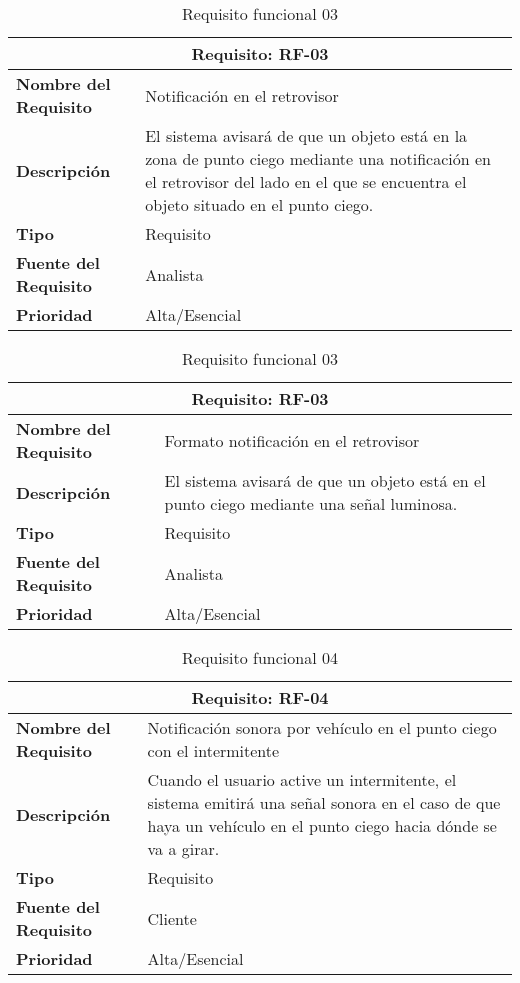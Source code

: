 \documentclass[10pt,a4paper,oldfontcommands]{dpds}
\begin{document}
\begin{table}[H]
\begin{center}
\begin{tabular}{p{} p{7cm}}
\multicolumn{2}{c}{\textbf{Requisito: RF-03} } \\
\hline \hline
\textbf{Nombre del Requisito} & Notificación en el retrovisor \\
\textbf{Descripción} & El sistema avisará de que un objeto está en la zona de punto ciego mediante una notificación en el retrovisor del lado en el que se encuentra el objeto situado en el punto ciego.\\
\textbf{Tipo} & Requisito  \\
\textbf{Fuente del Requisito} & Analista  \\
\textbf{Prioridad} & Alta/Esencial  \\ \hline
\end{tabular}
\caption{Requisito funcional 03}
\label{tab:personal}
\end{center}
\end{table}

\begin{table}[H]
\begin{center}
\begin{tabular}{p{} p{7cm}}
\multicolumn{2}{c}{\textbf{Requisito: RF-03} } \\
\hline \hline
\textbf{Nombre del Requisito} & Formato notificación en el retrovisor \\
\textbf{Descripción} & El sistema avisará de que un objeto está en el punto ciego mediante una señal luminosa.\\
\textbf{Tipo} & Requisito  \\
\textbf{Fuente del Requisito} & Analista  \\
\textbf{Prioridad} & Alta/Esencial  \\ \hline
\end{tabular}
\caption{Requisito funcional 03}
\label{tab:personal}
\end{center}
\end{table}

\begin{table}[H]
\begin{center}
\begin{tabular}{p{} p{7cm}}
\multicolumn{2}{c}{\textbf{Requisito: RF-04} } \\
\hline \hline
\textbf{Nombre del Requisito} & Notificación sonora por vehículo en el punto ciego con el intermitente  \\
\textbf{Descripción} &  Cuando el usuario active un intermitente, el sistema emitirá una señal sonora en el caso de que haya un vehículo en el punto ciego hacia dónde se va a girar. \\
\textbf{Tipo} & Requisito  \\
\textbf{Fuente del Requisito} & Cliente  \\
\textbf{Prioridad} & Alta/Esencial  \\ \hline
\end{tabular}
\caption{Requisito funcional 04}
\label{tab:personal}
\end{center}
\end{table}
\end{document}
